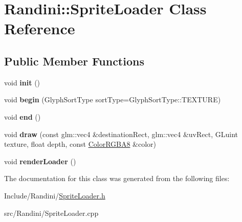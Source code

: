 \hypertarget{classRandini_1_1SpriteLoader}{
\section{Randini::SpriteLoader Class Reference}
\label{classRandini_1_1SpriteLoader}
}
\subsection*{Public Member Functions}
\begin{DoxyCompactItemize}
\item 
\hypertarget{classRandini_1_1SpriteLoader_a1929e27cf379b3b957b1acc5362b7331}{
void {\bfseries init} ()}
\label{classRandini_1_1SpriteLoader_a1929e27cf379b3b957b1acc5362b7331}

\item 
\hypertarget{classRandini_1_1SpriteLoader_af4e355ad05c95b85af373d4f3d5a9c30}{
void {\bfseries begin} (GlyphSortType sortType=GlyphSortType::TEXTURE)}
\label{classRandini_1_1SpriteLoader_af4e355ad05c95b85af373d4f3d5a9c30}

\item 
\hypertarget{classRandini_1_1SpriteLoader_af13de8f51b5c6428751cf417aa8efdc8}{
void {\bfseries end} ()}
\label{classRandini_1_1SpriteLoader_af13de8f51b5c6428751cf417aa8efdc8}

\item 
\hypertarget{classRandini_1_1SpriteLoader_acfb6c713ca114db19e1b724ed08fc645}{
void {\bfseries draw} (const glm::vec4 \&destinationRect, glm::vec4 \&uvRect, GLuint texture, float depth, const \hyperlink{structRandini_1_1ColorRGBA8}{ColorRGBA8} \&color)}
\label{classRandini_1_1SpriteLoader_acfb6c713ca114db19e1b724ed08fc645}

\item 
\hypertarget{classRandini_1_1SpriteLoader_ad552f49e04affcffc57936ff1b6c2cc0}{
void {\bfseries renderLoader} ()}
\label{classRandini_1_1SpriteLoader_ad552f49e04affcffc57936ff1b6c2cc0}

\end{DoxyCompactItemize}


The documentation for this class was generated from the following files:\begin{DoxyCompactItemize}
\item 
Include/Randini/\hyperlink{SpriteLoader_8h}{SpriteLoader.h}\item 
src/Randini/SpriteLoader.cpp\end{DoxyCompactItemize}

